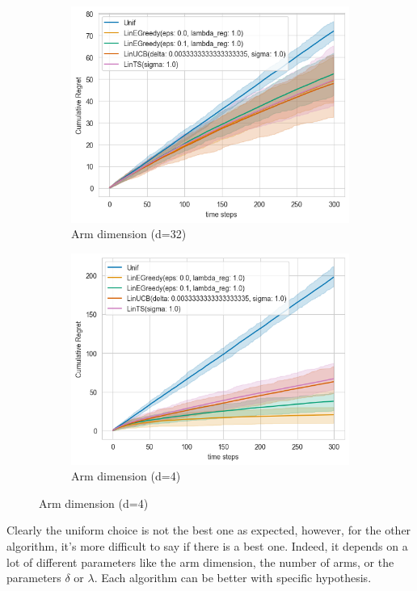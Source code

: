 \begin{itemize}
\begin{figure}[h]
      \centering
      \begin{subfigure}[b]{0.48\textwidth}
          \centering
          \includegraphics[width=\textwidth]{plots/output.png}
          \caption{Arm dimension (d=32)}
      \end{subfigure}
      \hfill
      \begin{subfigure}[b]{0.48\textwidth}
          \centering
          \includegraphics[width=\textwidth]{plots/output1.png}
          \caption{Arm dimension (d=4)}
      \end{subfigure}
\end{figure}

Clearly the uniform choice is not the best one as expected, however, for the other algorithm, it's more difficult to say if there is a best one. Indeed, it depends on a lot of different parameters like the arm dimension, the number of arms, or the parameters $\delta$ or $\lambda$. Each algorithm can be better with specific hypothesis.

\end{itemize}





